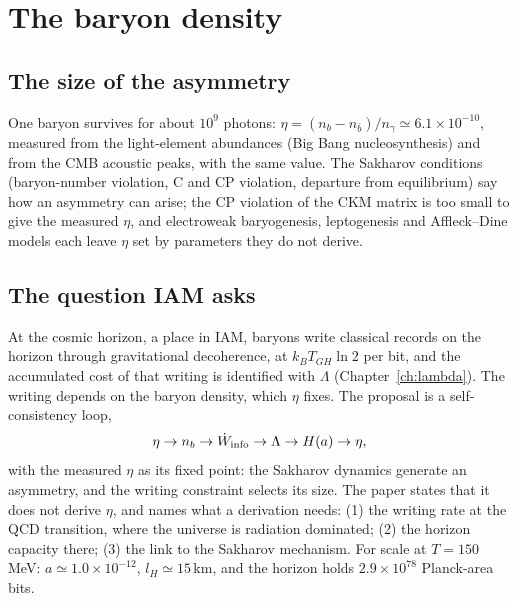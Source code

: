 \providecommand{\authorhold}[1]{\par\smallskip\noindent\fbox{\parbox{0.95\linewidth}{\small\textbf{Author hold.} #1}}\par\smallskip}
\chapter{The baryon density}\label{ch:baryon}

\section{The size of the asymmetry}
One baryon survives for about $10^9$ photons: $\eta=(n_b-n_{\bar b})/n_\gamma\simeq6.1\times10^{-10}$, measured from the light-element
abundances (Big Bang nucleosynthesis) and from the CMB acoustic peaks, with the same value. The Sakharov conditions (baryon-number violation,
C and CP violation, departure from equilibrium) say how an asymmetry can arise; the CP violation of the CKM matrix is too small to give the
measured $\eta$, and electroweak baryogenesis, leptogenesis and Affleck--Dine models each leave $\eta$ set by parameters they do not derive.

\section{The question IAM asks}
At the cosmic horizon, a place in IAM, baryons write classical records on the horizon through gravitational decoherence, at $k_BT_{GH}\ln2$ per bit,
and the accumulated cost of that writing is
identified with $\Lambda$ (Chapter~\ref{ch:lambda}). The writing depends on the baryon density, which $\eta$ fixes. The proposal is a
self-consistency loop,
\begin{equation}\eta\to n_b\to\dot W_{\rm info}\to\Lambda\to H(a)\to\eta,\end{equation}
with the measured $\eta$ as its fixed point: the Sakharov dynamics generate an asymmetry, and the writing constraint selects its size. The
paper states that it does not derive $\eta$, and names what a derivation needs: (1) the writing rate at the QCD transition, where the universe is
radiation dominated; (2) the horizon capacity there; (3) the link to the Sakharov mechanism. For scale at $T=150$\,MeV: $a\simeq1.0\times10^{-12}$,
$l_H\simeq15$\,km, and the horizon holds $2.9\times10^{78}$ Planck-area bits.


